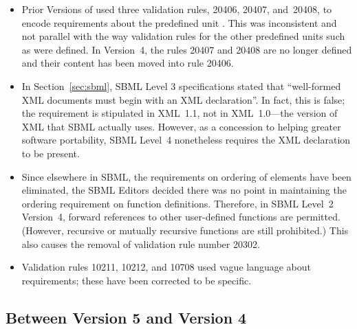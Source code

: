 \begin{itemize}
\item Prior Versions of \sbmltwo used three validation rules,
  20406, 20407, and~20408, to encode requirements about the
  predefined unit .  This was inconsistent and not
  parallel with the way validation rules for the other predefined
  units such as  were defined.  In Version~4, the
  rules 20407 and 20408 are no longer defined and their content
  has been moved into rule 20406.


\item In Section~\ref{sec:sbml}, SBML Level 3 specifications
  stated that ``well-formed XML documents must begin with an XML
  declaration''.  In fact, this is false; the requirement is
  stipulated in XML~1.1, not in XML~1.0---the version of XML that
  SBML actually uses.  However, as a concession to helping greater
  software portability, SBML Level~4 nonetheless requires the XML
  declaration to be present.

\item Since elsewhere in SBML, the requirements on ordering of
  elements have been eliminated, the SBML Editors decided there
  was no point in maintaining the ordering requirement on function
  definitions.  Therefore, in SBML Level~2 Version~4, forward
  references to other user-defined functions are permitted.
  (However, recursive or mutually recursive functions are still
  prohibited.)  This also causes the removal of validation rule
  number 20302.

\item Validation rules 10211, 10212, and 10708 used vague language
  about requirements; these have been corrected to be specific.

\end{itemize}


\subsection{Between Version 5 and Version 4}

